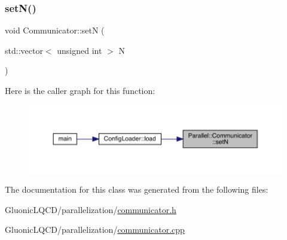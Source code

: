 \subsubsection{\texorpdfstring{setN()}{setN()}}
{\footnotesize\ttfamily void Communicator\+::setN (\begin{DoxyParamCaption}\item[{std\+::vector$<$ unsigned int $>$}]{N }\end{DoxyParamCaption})\hspace{0.3cm}{\ttfamily [static]}}

Here is the caller graph for this function\+:
\nopagebreak
\begin{figure}[H]
\begin{center}
\leavevmode
\includegraphics[width=350pt]{class_parallel_1_1_communicator_a1db417babab93c8d8bf6339ff2bab540_icgraph}
\end{center}
\end{figure}


The documentation for this class was generated from the following files\+:\begin{DoxyCompactItemize}
\item 
Gluonic\+L\+Q\+C\+D/parallelization/\mbox{\hyperlink{communicator_8h}{communicator.\+h}}\item 
Gluonic\+L\+Q\+C\+D/parallelization/\mbox{\hyperlink{communicator_8cpp}{communicator.\+cpp}}\end{DoxyCompactItemize}
